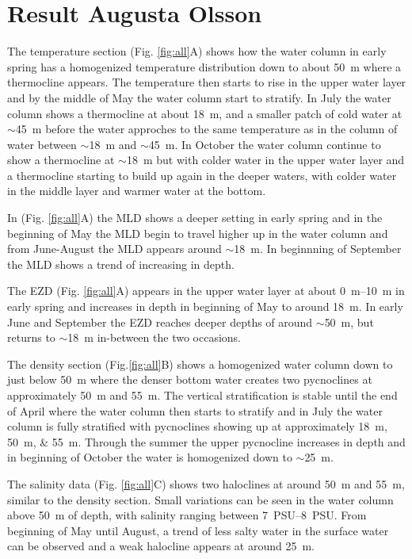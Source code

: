 \documentclass[../Main.tex]{subfiles}
\begin{document}
\section*{\crule[blue]{.3cm}{.3cm} Result \scriptsize{Augusta Olsson}}
The temperature section (Fig. \ref{fig:all}A) shows how the water column in early spring has a homogenized temperature distribution down to about \SI{50}{\metre} where a thermocline appears. The temperature then starts to rise in the upper water layer and by the middle of May the water column start to stratify. In July the water column shows a thermocline at about \SI{18}{m}, and a smaller patch of cold water at $\sim$\SI{45}{\metre} before the water approches to the same temperature as in the column of water between $\sim$\SI{18}{\metre} and $\sim$\SI{45}{\metre}. 
In October the water column continue to show a thermocline at $\sim$\SI{18}{\metre} but with colder water in the upper water layer and a thermocline starting to build up again in the deeper waters, with colder water in the middle layer and warmer water at the bottom. 

In (Fig. \ref{fig:all}A) the MLD shows a deeper setting in early spring and in the beginning of May the MLD begin to travel higher up in the water column and from June-August the MLD appears around $\sim$\SI{18}{\metre}. In beginnning of September the MLD shows a trend of increasing in depth. 

The EZD (Fig. \ref{fig:all}A) appears in the upper water layer at about \SIrange{0}{10}{m} in early spring and increases in depth in beginning of May to around \SI{18}{m}. In early June and September the EZD reaches deeper depths of around $\sim$\SI{50}{\metre}, but returns to $\sim$\SI{18}{\metre} in-between the two occasions.

The density section (Fig.\ref{fig:all}B) shows a homogenized water column down to just below \SI{50}{m} where the denser bottom water creates two pycnoclines at approximately \SI{50}{m} and \SI{55}{m}. The vertical stratification is stable until the end of April where the water column then starts to stratify and in July the water column is fully stratified with pycnoclines showing up at approximately \SIlist{18;50;55}{\metre}. 
Through the summer the upper pycnocline increases in depth and in beginning of October the water is homogenized down to $\sim$\SI{25}{\metre}.

The salinity data (Fig. \ref{fig:all}C) shows two haloclines at around \SI{50}{m} and \SI{55}{m}, similar to the density section. Small variations can be seen in the water column above \SI{50}{m} of depth, with salinity ranging between \SIrange{7}{8}{PSU}. From beginning of May until August, a trend of less salty water in the surface water can be observed and a weak halocline appears at around \SI{25}{m}.
\end{document}
